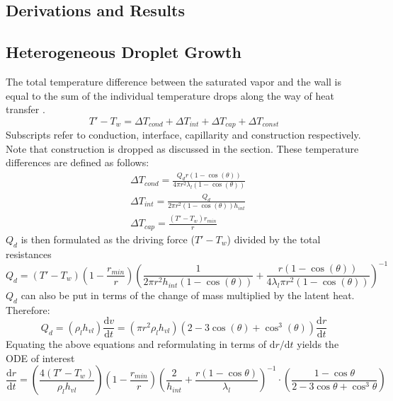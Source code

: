 \documentclass[12pt]{article}
\numberwithin{equation}{section}
\begin{document}
\begin{appendices}
\section{Derivations and Results}\label{s:appendix A}

\subsection{Heterogeneous Droplet Growth}
The total temperature difference between the saturated vapor and the wall is equal to the sum of the individual temperature drops along the way of heat transfer \cite{khandekar2020drop}.
\begin{equation}
    T'-T_{w}=\Delta T_{cond}+\Delta T_{int}+\Delta T_{cap}+\Delta T_{const}
\end{equation}
Subscripts refer to conduction, interface, capillarity and construction respectively. Note that construction is dropped as discussed in the section.
These temperature differences are defined as follows:
\begin{equation}
    \begin{aligned}
        &\Delta T_{cond}=\frac{Q_{d}r(1-\cos (\theta))}{4\pi r^{2}\lambda_{l}(1-\cos (\theta))}\\
        &\Delta T_{int}=\frac{Q_{d}}{2\pi r^{2}(1-\cos (\theta))h_{int}}\\
        &\Delta T_{cap}=\frac{(T'-T_{w})r_{min}}{r}
    \end{aligned}
\end{equation}
$Q_{d}$ is then formulated as the driving force ($T'-T_{w}$) divided by the total resistances
\begin{equation}
    Q_{d}=(T'-T_{w})\left(1-\frac{r_{min}}{r}\right)\left(\frac{1}{2\pi r^{2}h_{int}(1-\cos (\theta))}+\frac{r(1-\cos (\theta))}{4\lambda_{l}\pi r^{2}(1-\cos (\theta))}\right)^{-1}
\end{equation} 
$Q_{d}$ can also be put in terms of the change of mass multiplied by the latent heat. Therefore:
\begin{equation}
    Q_{d}=(\rho_{l}h_{vl})\frac{\mathrm{d}v}{\mathrm{d}t}=(\pi r^{2}\rho_{l}h_{vl})(2-3\cos (\theta)+\cos^{3}(\theta) )\frac{\mathrm{d}r}{\mathrm{d}t}
\end{equation}
Equating the above equations and reformulating in terms of $\mathrm{d}r/\mathrm{d}t$ yields the ODE of interest
\begin{equation}
    \frac{\mathrm{d}r}{\mathrm{d}t}= \left(\frac{4(T'-T_{w})}{\rho_{l}h_{vl}}\right)(1-\frac{r_{min}}{r})\left(\frac{2}{h_{int}}+\frac{r(1-\cos\theta)}{\lambda_{l}}\right)^{-1}  \cdot\left(\frac{1-\cos\theta}{2-3\cos\theta+\cos^{3}\theta}\right)
\end{equation}


\end{appendices}
\end{document}
